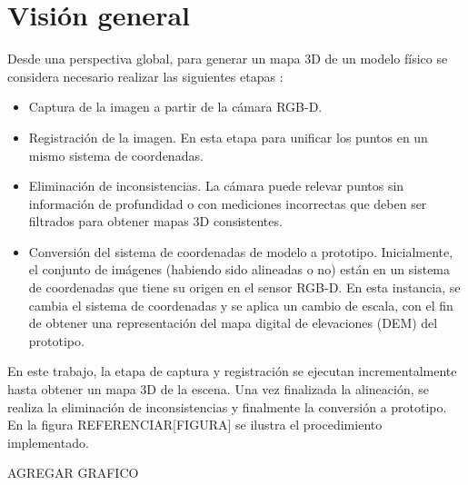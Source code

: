 \chapter{Visión general}

Desde una perspectiva global, para generar un mapa 3D de un modelo físico se considera necesario realizar las siguientes etapas :
\begin{itemize}

\item Captura de la imagen a partir de la cámara RGB-D.

\item Registración de la imagen. En esta etapa para unificar los puntos en un mismo sistema de coordenadas.

\item Eliminación de inconsistencias. La cámara puede relevar puntos sin información de profundidad o con mediciones incorrectas que deben ser filtrados para obtener mapas 3D consistentes. 

\item Conversión del sistema de coordenadas de modelo a prototipo. Inicialmente, el conjunto de imágenes (habiendo sido alineadas o no) están en un sistema de coordenadas que tiene su origen en el sensor RGB-D. En esta instancia, se cambia el sistema de coordenadas y se aplica un cambio de escala, con el fin de obtener una representación del mapa digital de elevaciones (DEM) del prototipo.

\end{itemize}

En este trabajo, la etapa de captura y registración se ejecutan incrementalmente hasta obtener un mapa 3D de la escena. Una vez finalizada la alineación, se realiza la eliminación de inconsistencias y finalmente la conversión a prototipo. En la figura REFERENCIAR[FIGURA] se ilustra el procedimiento implementado.

AGREGAR GRAFICO

